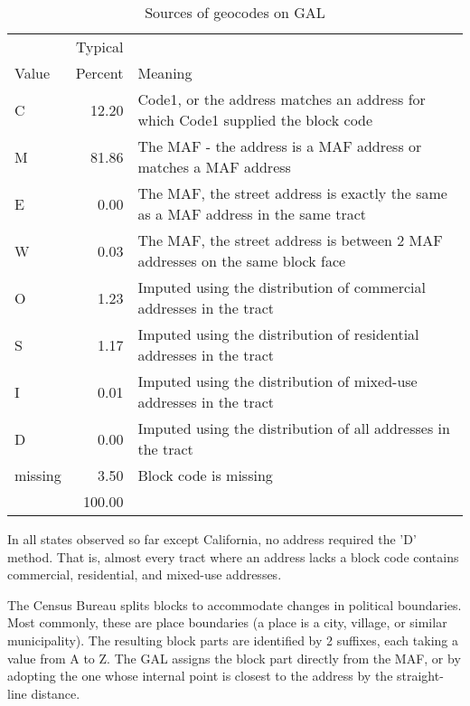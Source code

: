 \begin{table}[htbp]
\footnotesize
  \centering
  \caption{Sources of geocodes on GAL}
  \label{tab:gal:a_block_src}
  \begin{tabular}{lrp{5in}}
       &Typical\\
Value  &  Percent &  Meaning                                                                              \\  
\hline
\hline
C      &         12.20   &  Code1, or the address matches an address for which Code1 supplied the block code     \\
M      &         81.86   &  The MAF - the address is a MAF address or matches a MAF address                      \\
E      &          0.00   &  The MAF, the street address is exactly the same as a MAF address in the same tract   \\
W      &          0.03   &  The MAF, the street address is between 2 MAF addresses on the same block face        \\
O      &          1.23   &  Imputed using the distribution of commercial addresses in the tract                  \\
S      &          1.17   &  Imputed using the distribution of residential addresses in the tract                 \\
I      &          0.01   &  Imputed using the distribution of mixed-use addresses in the tract                   \\
D      &          0.00   &  Imputed using the distribution of all addresses in the tract                         \\
missing&          3.50   &  Block code is missing                                                                \\                
\hline
       &       100.00\\

  \end{tabular}
\end{table}

In all states observed so far except California, no address required the 'D' method. That is, almost every
tract where an address lacks a block code contains commercial, residential, and mixed-use addresses. 

The Census Bureau splits blocks to accommodate changes in political boundaries. Most commonly, these
are place boundaries (a place is a city, village, or similar municipality). The resulting block parts are
identified by 2 suffixes, each taking a value from A to Z. The GAL assigns the block part directly from
the MAF, or by adopting the one whose internal point is closest to the address by the straight-line
distance. 

